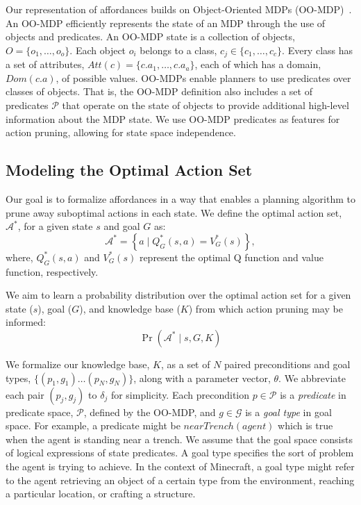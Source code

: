 \documentclass[letterpaper]{article}
\begin{document}
Our representation of affordances builds on Object-Oriented MDPs
(OO-MDP)~\citep{diuk08}.  An OO-MDP efficiently represents the state
of an MDP through the use of objects and predicates.  An OO-MDP state
is a collection of objects, $O = \{o_1, \ldots, o_o \}$.  Each object
$o_i$ belongs to a class, $c_j \in \{c_1, \ldots, c_c\}$. Every class
has a set of attributes, $Att(c) = \{c.a_1, \ldots, c.a_a \}$, each of
which has a domain, $Dom(c.a)$, of possible values. OO-MDPs enable
planners to use predicates over classes of objects. That is, the
OO-MDP definition also includes a set of predicates $\mathcal{P}$ that
operate on the state of objects to provide additional high-level
information about the MDP state. We use OO-MDP predicates as features
for action pruning, allowing for state space independence.

\subsection{Modeling the Optimal Action Set}


Our goal is to formalize affordances in a way that enables a planning
algorithm to prune away suboptimal actions in each state. We define
the optimal action set, $\mathcal{A}^*$, for a given state $s$ and
goal $G$ as:
\begin{equation}
\mathcal{A}^* = \left\{ a \mid Q^*_G(s,a) = V^*_G(s) \right\}, 
\label{eq:opt_act_set}
\end{equation}
where, $Q^*_G(s,a)$ and $V^*_G(s)$ represent the optimal Q function and 
value function, respectively. 

We aim to learn a probability distribution over the optimal action set
for a given state ($s$), goal ($G$), and knowledge base ($K$) from
which action pruning may be informed:
\begin{equation}
\Pr(\mathcal{A}^* \mid s, G, K)
\label{eq:master}
\end{equation}

We formalize our knowledge base, $K$, as a set of $N$ paired
preconditions and goal types, $\{ (p_1, g_1) \ldots (p_{N}, g_{N})\}$,
along with a parameter vector, $\theta$. We abbreviate each pair
$(p_j, g_j)$ to $\delta_j$ for simplicity. Each precondition $p \in
\mathcal{P}$ is a {\it predicate} in predicate space, $\mathcal{P}$,
defined by the OO-MDP, and $g \in \mathcal{G}$ is a {\it goal type} in
goal space.  For example, a predicate might be $nearTrench(agent)$
which is true when the agent is standing near a trench.  We assume
that the goal space consists of logical expressions of state
predicates. A goal type specifies the sort of problem the agent is
trying to achieve. In the context of Minecraft, a goal type might
refer to the agent retrieving an object of a certain type from the
environment, reaching a particular location, or crafting a
structure. 
\end{document}
